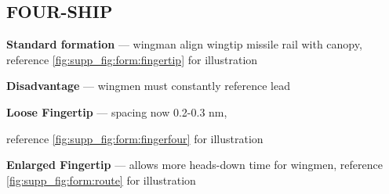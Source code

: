 \subsection{FOUR-SHIP}

\begin{tcoloritemize}
    \blueitem[Fingertip]
    \textbf{Standard formation} --- wingman align wingtip missile rail with canopy,
    reference \cref{fig:supp_fig:form:fingertip} for illustration
    
    \medskip
    \textbf{Disadvantage} --- wingmen must constantly reference lead

    \textbf{Loose Fingertip} --- spacing now 0.2-0.3 nm,

    reference \cref{fig:supp_fig:form:fingerfour} for illustration

    \blueitem[Route]
    \textbf{Enlarged Fingertip} --- allows more heads-down time for wingmen,
    reference \cref{fig:supp_fig:form:route} for illustration
\end{tcoloritemize}

